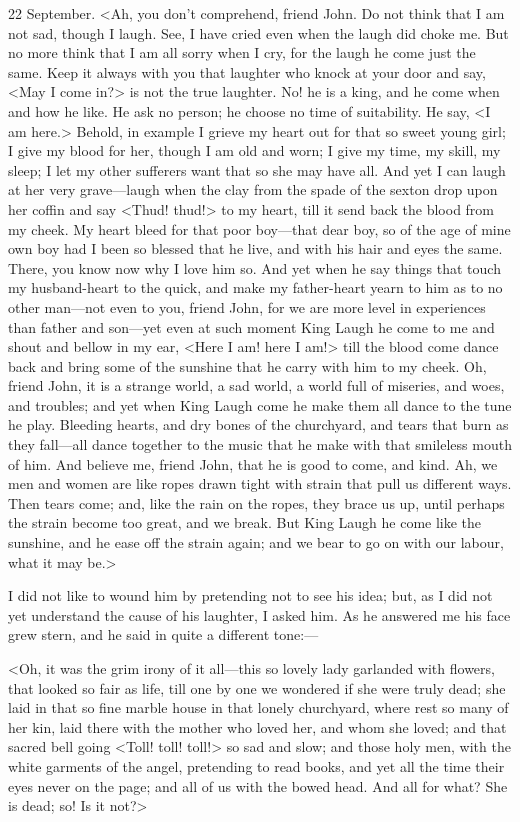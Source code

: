 \begin{diary}{22 September.}
<Ah, you don't comprehend, friend John. Do not think that I am not sad, though I laugh. See, I have cried even when the laugh did choke me. But no more think that I am all sorry when I cry, for the laugh he come just the same. Keep it always with you that laughter who knock at your door and say, <May I come in?> is not the true laughter. No! he is a king, and he come when and how he like. He ask no person; he choose no time of suitability. He say, <I am here.> Behold, in example I grieve my heart out for that so sweet young girl; I give my blood for her, though I am old and worn; I give my time, my skill, my sleep; I let my other sufferers want that so she may have all. And yet I can laugh at her very grave—laugh when the clay from the spade of the sexton drop upon her coffin and say <Thud! thud!> to my heart, till it send back the blood from my cheek. My heart bleed for that poor boy—that dear boy, so of the age of mine own boy had I been so blessed that he live, and with his hair and eyes the same. There, you know now why I love him so. And yet when he say things that touch my husband-heart to the quick, and make my father-heart yearn to him as to no other man—not even to you, friend John, for we are more level in experiences than father and son—yet even at such moment King Laugh he come to me and shout and bellow in my ear, <Here I am! here I am!> till the blood come dance back and bring some of the sunshine that he carry with him to my cheek. Oh, friend John, it is a strange world, a sad world, a world full of miseries, and woes, and troubles; and yet when King Laugh come he make them all dance to the tune he play. Bleeding hearts, and dry bones of the churchyard, and tears that burn as they fall—all dance together to the music that he make with that smileless mouth of him. And believe me, friend John, that he is good to come, and kind. Ah, we men and women are like ropes drawn tight with strain that pull us different ways. Then tears come; and, like the rain on the ropes, they brace us up, until perhaps the strain become too great, and we break. But King Laugh he come like the sunshine, and he ease off the strain again; and we bear to go on with our labour, what it may be.>

I did not like to wound him by pretending not to see his idea; but, as I did not yet understand the cause of his laughter, I asked him. As he answered me his face grew stern, and he said in quite a different tone:—

<Oh, it was the grim irony of it all—this so lovely lady garlanded with flowers, that looked so fair as life, till one by one we wondered if she were truly dead; she laid in that so fine marble house in that lonely churchyard, where rest so many of her kin, laid there with the mother who loved her, and whom she loved; and that sacred bell going <Toll! toll! toll!> so sad and slow; and those holy men, with the white garments of the angel, pretending to read books, and yet all the time their eyes never on the page; and all of us with the bowed head. And all for what? She is dead; so! Is it not?>


\end{diary}

